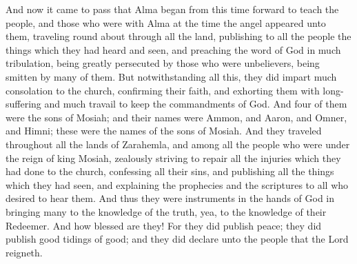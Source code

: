 \bverse \iffalse And now it came to pass that Alma began from this time forward to teach the people, and those who were with Alma at the time the angel appeared unto them, traveling round about through all the land, publishing to all the people the things which they had heard and seen, and preaching the word of God in much tribulation, being greatly persecuted by those who were unbelievers, being smitten by many of them. \fi
And now it came to pass that Alma began from this time forward to teach the people, and those who were with Alma at the time the angel appeared unto them, traveling round about through all the land, publishing to all the people the things which they had heard and seen, and preaching the word of God in much tribulation, being greatly persecuted by those who were unbelievers, being smitten by many of them.
\bverse \iffalse But notwithstanding all this, they did impart much consolation to the church, confirming their faith, and exhorting them with long-suffering and much travail to keep the commandments of God. \fi
But notwithstanding all this, they did impart much consolation to the church, confirming their faith, and exhorting them with long-suffering and much travail to keep the commandments of God.
\bverse \iffalse And four of them were the sons of Mosiah; and their names were Ammon, and Aaron, and Omner, and Himni; these were the names of the sons of Mosiah. \fi
And four of them were the sons of Mosiah; and their names were Ammon, and Aaron, and Omner, and Himni; these were the names of the sons of Mosiah.
\bverse \iffalse And they traveled throughout all the lands of Zarahemla, and among all the people who were under the reign of king Mosiah, zealously striving to repair all the injuries which they had done to the church, confessing all their sins, and publishing all the things which they had seen, and explaining the prophecies and the scriptures to all who desired to hear them. \fi
And they traveled throughout all the lands of Zarahemla, and among all the people who were under the reign of king Mosiah, zealously striving to repair all the injuries which they had done to the church, confessing all their sins, and publishing all the things which they had seen, and explaining the prophecies and the scriptures to all who desired to hear them.
\bverse \iffalse And thus they were instruments in the hands of God in bringing many to the knowledge of the truth, yea, to the knowledge of their Redeemer. \fi
And thus they were instruments in the hands of God in bringing many to the knowledge of the truth, yea, to the knowledge of their Redeemer.
\bverse \iffalse And how blessed are they! For they did publish peace; they did publish good tidings of good; and they did declare unto the people that the Lord reigneth. \fi
And how blessed are they! For they did publish peace; they did publish good tidings of good; and they did declare unto the people that the Lord reigneth.

